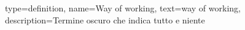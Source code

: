 {
    type=definition,
    name=Way of working,
    text=way of working,
    description={Termine oscuro che indica tutto e niente}
}

